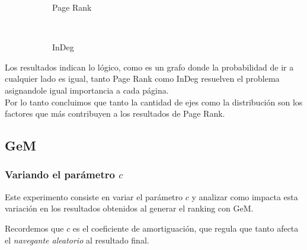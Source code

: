 \begin{figure}[H]
    \centering
    \begin{subfigure}[t]{0.5\textwidth}
      \begin{center}
        Page Rank\\
      \end{center}
    \end{subfigure}%
    ~
    \begin{subfigure}[t]{0.5\textwidth}
      \begin{center}
        InDeg\\
      \end{center}
    \end{subfigure}
\end{figure}

Los resultados indican lo lógico, como es un grafo donde la probabilidad de ir a cualquier lado es igual, tanto Page Rank como InDeg resuelven el problema asignandole igual importancia a cada página.\\
Por lo tanto concluimos que tanto la cantidad de ejes como la distribución son los factores que más contribuyen a los resultados de Page Rank.

\subsection{GeM}

\subsubsection{Variando el parámetro $c$}\label{exp_gem_2}
Este experimento consiste en variar el parámetro $c$ y analizar como impacta esta
variación en los resultados obtenidos al generar el ranking con GeM.

Recordemos que $c$ es el coeficiente de amortiguación, que regula que tanto afecta
el \textit{navegante aleatorio} al resultado final.

